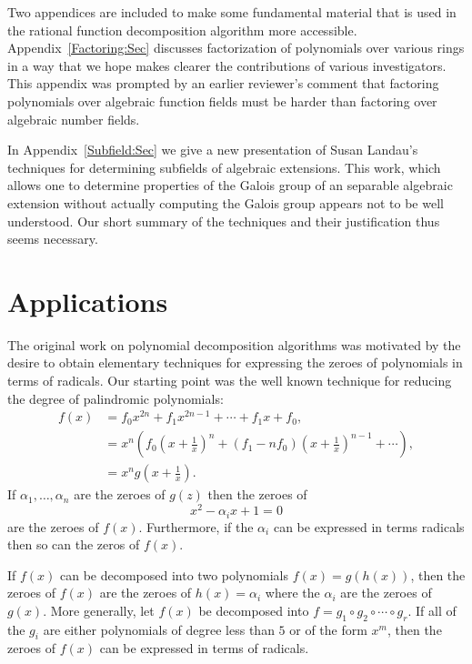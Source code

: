 Two appendices are included to make some fundamental material that is
used in the rational function decomposition algorithm more accessible.
Appendix~\ref{Factoring:Sec} discusses factorization of polynomials
over various rings in a way that we hope makes clearer the
contributions of various investigators.  This appendix was prompted by
an earlier reviewer's comment that factoring polynomials over
algebraic function fields must be harder than factoring over algebraic
number fields.

In Appendix~\ref{Subfield:Sec} we give a new presentation of Susan
Landau's techniques for determining subfields of algebraic extensions.
This work, which allows one to determine properties of the Galois
group of an separable algebraic extension without actually computing
the Galois group appears not to be well understood.  Our short summary
of the techniques and their justification thus seems necessary.



\section{Applications}
\label{Applications:Sec}

The original work on polynomial decomposition algorithms
\cite{Barton85} was motivated by the desire to obtain elementary 
techniques for expressing the zeroes of polynomials in terms of
radicals.  Our starting point was the well known technique for
reducing the degree of palindromic polynomials:
\[
\begin{aligned}
f(x) & = f_0x^{2n} + f_1 x^{2n-1} + \cdots + f_1 x + f_0, \\
     & =  x^n \left( f_0 \left(x + \frac{1}{x}\right)^n 
    + (f_1 - n f_0) \left(x + \frac{1}{x}\right)^{n-1} + \cdots \right), \\
     & = x^n g\left(x + \frac{1}{x}\right). 
\end{aligned}
\]
If $\alpha_1, \ldots, \alpha_n$ are the zeroes of $g(z)$ then the zeroes
of 
\[
x^2 - \alpha_i x + 1 = 0
\]
are the zeroes of $f(x)$.  Furthermore, if the $\alpha_i$ can be expressed
in terms radicals then so can the zeros of $f(x)$.

If $f(x)$ can be decomposed into two polynomials $f(x) =g(h(x))$, then the
zeroes of $f(x)$ are the zeroes of $h(x) = \alpha_i$ where the $\alpha_i$
are the zeroes of $g(x)$.  More generally, let $f(x)$ be decomposed into $f
= g_1 \circ g_2 \circ \cdots \circ g_r$.  If all of the $g_i$ are either
polynomials of degree less than $5$ or of the form $x^m$, then the zeroes
of $f(x)$ can be expressed in terms of radicals.

